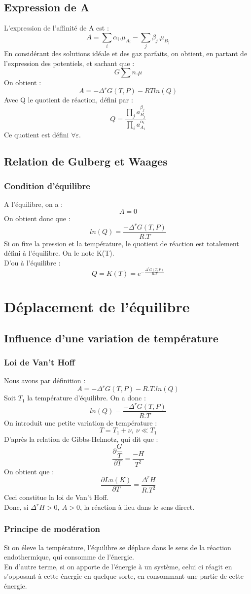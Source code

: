 \subsection{Expression de A}
L'expression de l'affinité de A est :
$$A = \sum_i \alpha_i.\mu_{A_i} - \sum_j \beta_j.\mu_{B_j}$$
En considérant des solutions idéale et des gaz parfaits, on obtient, en partant de l'expression des potentiels, et sachant que :
$$G \sum n.\mu$$
On obtient :
$$A = - \Delta^r G(T,P) -RTln(Q)$$
Avec Q le quotient de réaction, défini par : 
$$Q = \dfrac{\prod_j a_{B_j}^{\beta_j}}{\prod_i a_{A_i}^{\alpha_i}}$$
Ce quotient est défini $\forall \varepsilon$.
\subsection{Relation de Gulberg et Waages}
\subsubsection{Condition d'équilibre}
A l'équilibre, on a : 
$$A = 0$$
On obtient donc que : 
$$ln(Q) = \dfrac{-\Delta^r G(T,P)}{R.T}$$
Si on fixe la pression et la température, le quotient de réaction est totalement défini à l'équilibre. On le note K(T).\\
D'ou à l'équilibre : 
$$Q = K(T) = e^{-\frac{\Delta^r G(T,P)}{R.T}}$$
\section{Déplacement de l'équilibre}
\subsection{Influence d'une variation de température}
\subsubsection{Loi de Van't Hoff}
Nous avons par définition : 
$$A = -\Delta^r G(T,P) - R.T.ln(Q)$$
Soit $T_1$ la température d'équilibre. On a donc : 
$$ln(Q) = \dfrac{-\Delta^r G(T,P)}{R.T}$$
On introduit une petite variation de température : 
$$T = T_1 + \nu,~ \nu\ll T_1$$
D'après la relation de Gibbs-Helmotz, qui dit que : 
$$\dfrac{\partial \dfrac{G}{T}}{\partial T} = \dfrac{-H}{T^2}$$
On obtient que :
$$\dfrac{\partial Ln(K)}{\partial T} = \dfrac{\Delta^r H}{R.T^2}$$
Ceci constitue la loi de Van't Hoff.\\
Donc, si $\Delta^r H > 0,~ A>0$, la réaction à lieu dans le sens direct.
\subsubsection{Principe de modération}
Si on éleve la température, l'équilibre se déplace dans le sens de la réaction endothermique, qui consomme de l'énergie.\\
En d'autre terme, si on apporte de l'énergie à un système, celui ci réagit en s'opposant à cette énergie en quelque sorte, en consommant une partie de cette énergie.
